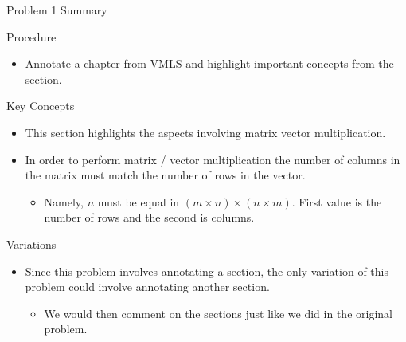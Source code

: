 \begin{summary}{Problem 1 Summary}
    \begin{statement}{Procedure}
        \begin{itemize}
            \item Annotate a chapter from VMLS and highlight important concepts from the section.
        \end{itemize}
    \end{statement}
    \begin{statement}{Key Concepts}
        \begin{itemize}
            \item This section highlights the aspects involving matrix vector multiplication.
            \item In order to perform matrix / vector multiplication the number of columns in the matrix must match the number of rows in the vector.
            \begin{itemize}
                \item Namely, $n$ must be equal in $(m \times n) \times (n \times m)$. First value is the number of rows and the second is columns.
            \end{itemize}
        \end{itemize}
    \end{statement}
    \begin{statement}{Variations}
        \begin{itemize}
            \item Since this problem involves annotating a section, the only variation of this problem could involve annotating another section.
            \begin{itemize}
                \item We would then comment on the sections just like we did in the original problem.
            \end{itemize}
        \end{itemize}
    \end{statement}
\end{summary}

